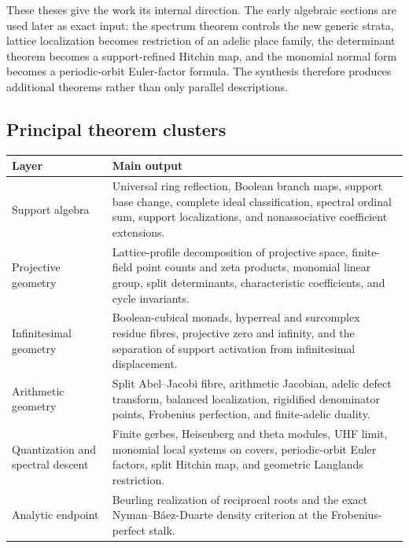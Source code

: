 \documentclass[11pt]{amsart}
\numberwithin{equation}{section}
\theoremstyle{definition}
\begin{document}
These theses give the work its internal direction.  The early algebraic
sections are used later as exact input: the spectrum theorem controls the
new generic strata, lattice localization becomes restriction of an adelic
place family, the determinant theorem becomes a support-refined Hitchin
map, and the monomial normal form becomes a periodic-orbit Euler-factor
formula.  The synthesis therefore produces additional theorems rather than
only parallel descriptions.

\subsection*{Principal theorem clusters}

\begin{center}
\renewcommand{\arraystretch}{1.25}
\begin{tabular}{>{\raggedright\arraybackslash}p{}>{\raggedright\arraybackslash}p{}}
\toprule
\textbf{Layer} & \textbf{Main output}\\
\midrule
Support algebra & Universal ring reflection, Boolean branch maps, support base change, complete
ideal classification, spectral ordinal sum, support localizations, and
nonassociative coefficient extensions.\\
Projective geometry & Lattice-profile decomposition of projective space,
finite-field point counts and zeta products, monomial linear group, split
determinants, characteristic coefficients, and cycle invariants.\\
Infinitesimal geometry & Boolean-cubical monads, hyperreal and surcomplex
residue fibres, projective zero and infinity, and the separation of support
activation from infinitesimal displacement.\\
Arithmetic geometry & Split Abel--Jacobi fibre, arithmetic Jacobian,
adelic defect transform, balanced localization, rigidified denominator
points, Frobenius perfection, and finite-adelic duality.\\
Quantization and spectral descent & Finite gerbes, Heisenberg and theta
modules, UHF limit, monomial local systems on covers, periodic-orbit Euler
factors, split Hitchin map, and geometric Langlands restriction.\\
Analytic endpoint & Beurling realization of reciprocal roots and the exact
Nyman--B\'aez-Duarte density criterion at the Frobenius-perfect stalk.\\
\bottomrule
\end{tabular}
\end{center}
\end{document}
